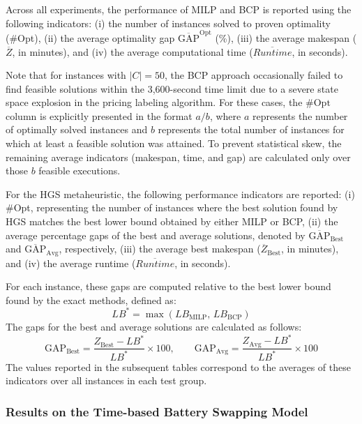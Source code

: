 \documentclass[3p, authoryear, 11pt]{elsarticle}
\begin{document}
Across all experiments, the performance of MILP and BCP is reported using the following indicators:
(i) the number of instances solved to proven optimality (\#Opt), 
(ii) the average optimality gap $\overline{\mathrm{GAP}}^{\mathrm{Opt}}$ (\%), 
(iii) the average makespan ($\overline{Z}$, in minutes), and 
(iv) the average computational time ($\overline{Runtime}$, in seconds).

Note that for instances with $|C| = 50$, the BCP approach occasionally failed to find feasible solutions within the 3,600-second time limit due to a severe state space explosion in the pricing labeling algorithm. For these cases, the $\#\text{Opt}$ column is explicitly presented in the format $a/b$, where $a$ represents the number of optimally solved instances and $b$ represents the total number of instances for which at least a feasible solution was attained. To prevent statistical skew, the remaining average indicators (makespan, time, and gap) are calculated only over those $b$ feasible executions.

For the HGS metaheuristic, the following performance indicators are reported:
(i) \#Opt, representing the number of instances where the best solution found by HGS matches the best lower bound obtained by either MILP or BCP, 
(ii) the average percentage gaps of the best and average solutions, denoted by $\overline{\mathrm{GAP}}_{\text{Best}}$ and $\overline{\mathrm{GAP}}_{\text{Avg}}$, respectively,
(iii) the average best makespan ($\overline{Z}_{\text{Best}}$, in minutes), and 
(iv) the average runtime ($\overline{Runtime}$, in seconds). 

For each instance, these gaps are computed relative to the best lower bound found by the exact methods, defined as:
\[
LB^{*} = \max(LB_{\mathrm{MILP}},\, LB_{\mathrm{BCP}})
\]
The gaps for the best and average solutions are calculated as follows:
\[
\mathrm{GAP}_{\text{Best}} = \frac{Z_{\text{Best}} - LB^{*}}{LB^{*}} \times 100, \qquad \mathrm{GAP}_{\text{Avg}} = \frac{Z_{\text{Avg}} - LB^{*}}{LB^{*}} \times 100
\]
The values reported in the subsequent tables correspond to the averages of these indicators over all instances in each test group.

\subsubsection{Results on the Time-based Battery Swapping Model}
\label{sec:performance_time_based}
\end{document}
